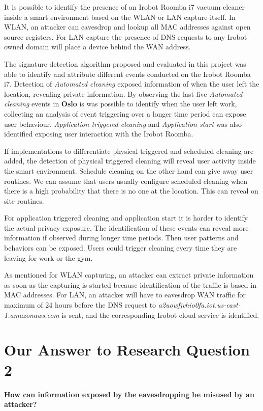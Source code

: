 It is possible to identify the presence of an Irobot Roomba i7 vacuum cleaner inside a smart environment based on the WLAN or LAN capture itself. In WLAN, an attacker can eavesdrop and lookup all  MAC addresses against open source registers. For LAN capture the presence of DNS requests to any Irobot owned domain will place a device behind the WAN address.

The signature detection algorithm proposed and evaluated in this project was able to identify and attribute different events conducted on the Irobot Roomba i7. Detection of \textit{Automated cleaning} exposed information of when the user left the location, revealing private information. By observing the last five \textit{Automated cleaning} events in \textbf{Oslo} is was possible to identify when the user left work, collecting an analysis of event triggering over a longer time period can expose user behaviour. \textit{Application triggered cleaning} and \textit{Application start} was also identified exposing user interaction with the Irobot Roomba.

If implementations to differentiate physical triggered and scheduled cleaning are added, the detection of physical triggered cleaning will reveal user activity inside the smart environment. Schedule cleaning on the other hand can give away user routines. We can assume that users usually configure scheduled cleaning when there is a high probability that there is no one at the location. This can reveal on site routines. 

For application triggered cleaning and application start it is harder to identify the actual privacy exposure. The identification of these events can reveal more information if observed during longer time periods. Then user patterns and behaviors can be exposed. Users could trigger cleaning every time they are leaving for work or the gym.

As mentioned for WLAN capturing, an attacker can extract private information as soon as the capturing is started because identification of the traffic is based in MAC addresses. For LAN, an attacker will have to eavesdrop WAN traffic for maximum of 24 hours before the DNS request to \textit{a2uowfjvhio0fa.iot.us-east-1.amazonaws.com} is sent, and the corresponding Irobot cloud service is identified. 

\section{Our Answer to Research Question  2}
\textbf{How can information exposed by the eavesdropping be misused by an attacker?} 

